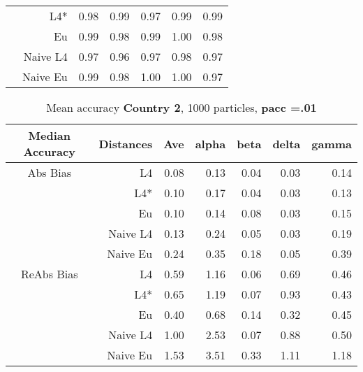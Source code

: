 \documentclass[a4paper,12pt,twoside]{book}
\begin{document}
\begin{table}[H]
\begin{tabular}{crrrrrr}
 
  &L4*  &    0.98 & 0.99 & 0.97 & 0.99 & 0.99 \\ 
 
 
&Eu &     0.99 & 0.98 & 0.99 & 1.00 & 0.98 \\ 
 
 
&Naive L4&    0.97 & 0.96 & 0.97 & 0.98 & 0.97 \\ 
 
&Naive Eu &     0.99 & 0.98 & 1.00 & 1.00 & 0.97 \\ 
  
 
\end{tabular}

\end{table}


\begin{table}[H]

\centering
\vfill
\caption{Mean  accuracy \textbf{Country 2}, 1000 particles, \textbf{pacc =.01}}


\begin{tabular}{crrrrrr}
  \hline
  
{\color{blue}Median Accuracy} & Distances & Ave & alpha & beta & delta & gamma \\ 
  \hline
{\color{blue}Abs Bias} & L4  &0.08 & 0.13 & 0.04 & 0.03 & 0.14 \\ 
  
&L4*  &0.10 & 0.17 & 0.04 & 0.03 & 0.13 \\ 
  
&Eu &  0.10 & 0.14 & 0.08 & 0.03 & 0.15 \\ 
  
&Naive L4&      0.13 & 0.24 & 0.05 & 0.03 & 0.19 \\  
 
  
&Naive Eu &  0.24 & 0.35 & 0.18 & 0.05 & 0.39 \\ 
  
   \hline
   
{\color{blue} ReAbs Bias } & L4  &0.59 & 1.16 & 0.06 & 0.69 & 0.46 \\ 
  
&L4*  &0.65 & 1.19 & 0.07 & 0.93 & 0.43 \\ 
  
  
&Eu &   
 0.40 & 0.68 & 0.14 & 0.32 & 0.45 \\ 
 
  
&Naive L4&  1.00 & 2.53 & 0.07 & 0.88 & 0.50 \\ 
   
&Naive Eu &    1.53 & 3.51 & 0.33 & 1.11 & 1.18 \\ 
  

\end{tabular}
\end{table}
\end{document}
